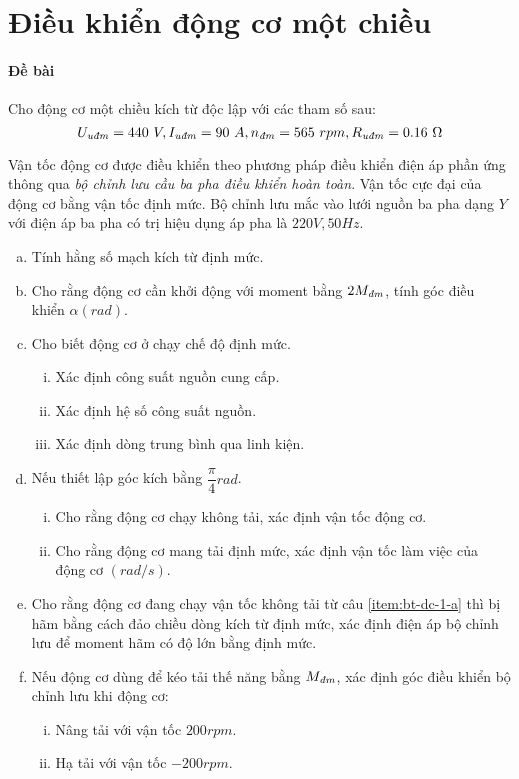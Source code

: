 \documentclass[12pt,a4paper]{article}
\begin{document}
\section{Điều khiển động cơ một chiều}
\paragraph{Đề bài} Cho động cơ một chiều kích từ độc lập với các tham số sau: $$\vqitalic{U} = 440 \unit{V}, \vqitalic{I} = 90 \unit{A}, \vitalic{n} = 565 \unit{rpm}, \vqitalic{R} = 0.16 \unit{\Omega}$$

Vận tốc động cơ được điều khiển theo phương pháp điều khiển điện áp phần ứng thông qua \textit{bộ chỉnh lưu cầu ba pha điều khiển hoàn toàn}. Vận tốc cực đại của động cơ bằng vận tốc định mức. Bộ chỉnh lưu mắc vào lưới nguồn ba pha dạng $Y$ với điện áp ba pha có trị hiệu dụng áp pha là $220 \unit{V}, 50 \unit{Hz}$.
\begin{enumerate}[a.]
\item Tính hằng số mạch kích từ định mức.
\item Cho rằng động cơ cần khởi động với moment bằng $2 \vitalic{M}$, tính góc điều khiển $\alpha \unit{(rad)}$.
\item Cho biết động cơ ở chạy chế độ định mức.
\begin{enumerate}[i.]
\item Xác định công suất nguồn cung cấp.
\item Xác định hệ số công suất nguồn.
\item Xác định dòng trung bình qua linh kiện.
\end{enumerate}
\item \label{item:bt-dc-1-a} Nếu thiết lập góc kích bằng $\dfrac{\pi}{4} \unit{rad}$.
\begin{enumerate}[i.]
\item Cho rằng động cơ chạy không tải, xác định vận tốc động cơ.
\item Cho rằng động cơ mang tải định mức, xác định vận tốc làm việc của động cơ $(rad/s)$.
\end{enumerate}
\item Cho rằng động cơ đang chạy vận tốc không tải từ câu \ref{item:bt-dc-1-a} thì bị hãm bằng cách đảo chiều dòng kích từ định mức, xác định điện áp bộ chỉnh lưu để moment hãm có độ lớn bằng định mức.
\item Nếu động cơ dùng để kéo tải thế năng bằng $\vitalic{M}$, xác định góc điều khiển bộ chỉnh lưu khi động cơ:
\begin{enumerate}[i.]
\item Nâng tải với vận tốc $200 \unit{rpm}$.
\item Hạ tải với vận tốc $-200 \unit{rpm}$.
\end{enumerate}
\end{enumerate}
\end{document}

